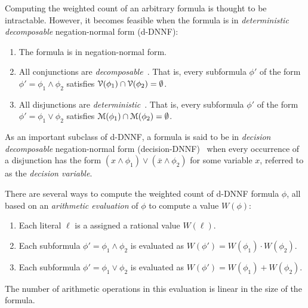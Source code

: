 \documentclass[letterpaper,USenglish,cleveref, autoref, thm-restate]{lipics-v2021}
\newcommand{\obar}[1]{\overline{#1}}
\newcommand{\lit}{\ell}
\newcommand{\dependencyset}{{\cal V}}
\newcommand{\modelset}{{\cal M}}
\begin{document}
Computing the weighted count of an arbitrary formula is thought to be intractable.  However, it becomes
feasible when the formula is in \emph{deterministic decomposable} negation-normal form (d-DNNF):
\begin{enumerate}
\item The formula is in negation-normal form.  
\item All conjunctions are \emph{decomposable}~\cite{darwiche:jacm:2001,darwiche:jair:2002}.  That is, every subformula $\phi'$ of the form $\phi' = \phi_1 \land \phi_2$
  satisfies $\dependencyset(\phi_1) \cap \dependencyset(\phi_2) = \emptyset$.
\item All disjunctions are \emph{deterministic}~\cite{darwiche:jancl:2001,darwiche:jair:2002}.  That is, every subformula $\phi'$ of the form $\phi' =\phi_1 \lor \phi_2$ satisfies
  $\modelset(\phi_1) \cap \modelset(\phi_2) = \emptyset$.
\end{enumerate}
As an important subclass of d-DNNF, a formula is said to be in 
\emph{decision decomposable} negation-normal form (decision-DNNF)~\cite{huang:jair:2007} when every occurrence of a disjunction has the form 
$(x \land \phi_1) \lor (\obar{x} \land \phi_2)$ for some variable $x$, referred to as the \emph{decision variable}.

There are several ways to compute the weighted count of d-DNNF formula $\phi$, all
based on an \emph{arithmetic evaluation} of $\phi$ to compute a value $W(\phi)$:
\begin{enumerate}
\item Each literal $\lit$ is a assigned a rational value $W(\lit)$.
\item Each subformula $\phi' = \phi_1 \land \phi_2$ is evaluated as $W(\phi') = W(\phi_1) \cdot W(\phi_2)$.
\item Each subformula $\phi' = \phi_1 \lor \phi_2$ is evaluated as $W(\phi') = W(\phi_1) + W(\phi_2)$.
\end{enumerate}
The number of arithmetic operations in this evaluation is linear in the size of the formula.
\end{document}
